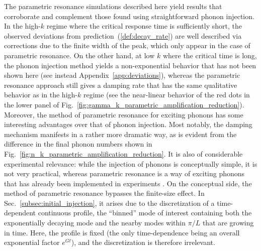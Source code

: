 \documentclass[aps,prd,notitlepage,amsfonts,amssymb,amsmath,nofootinbib,superscriptaddress,longbibliography]{revtex4-2}
\begin{document}
The parametric resonance simulations described here yield results that corroborate and complement those found using straightforward phonon injection.
In the high-$k$ regime where the critical response time is sufficiently short, the observed deviations from prediction~(\ref{def:decay_rate}) are well described via corrections due to the finite width of the peak, which only appear in the case of parametric resonance.  
On the other hand, at low $k$ where the critical time is long, the phonon injection method yields a non-exponential behavior that has not been shown here (see instead Appendix~\ref{app:deviations}), whereas the parametric resonance approach still gives a damping rate that has the same qualitative behavior as in the high-$k$ regime (see the near-linear behavior of the red dots in the lower panel of Fig.~\ref{fig:gamma_k_parametric_amplification_reduction}).
Moreover, the method of parametric resonance for exciting phonons has some interesting advantages over that of phonon injection. 
Most notably, the damping mechanism manifests in a rather more dramatic way, as is evident from the difference in the final phonon numbers shown in Fig.~\ref{fig:n_k_parametric_amplification_reduction}.  It is also of considerable experimental relevance: while the injection of phonons is conceptually simple, it is not very practical, whereas parametric resonance is a way of exciting phonons that has already been implemented in experiments \cite{Jaskula2012}.
On the conceptual side, the method of parametric resonance bypasses the finite-size effect.
In Sec.~\ref{subsec:initial_injection}, it arises due to the discretization of a time-dependent continuous profile, the ``binned'' mode of interest containing both the exponentially decaying mode and the nearby modes within $\pi/L$ that are growing in time.  Here, the profile is fixed (the only time-dependence being an overall exponential factor $e^{G t}$), and the discretization is therefore irrelevant.
\end{document}
